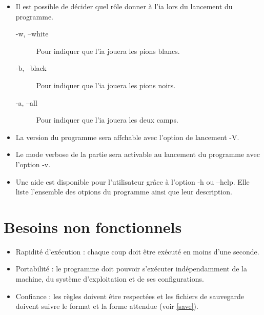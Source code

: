 \documentclass[10pt,a4paper]{article}
\begin{document}
\begin {itemize}
\begin{figure}[H]
\begin{BVerbatim}
    \end{BVerbatim}
    \caption {Exemple de grille générée avec l'option \textsc{-s2}.\label{fig:exemple_taille}}
  \end{figure}
\item  Il est possible de décider quel rôle donner à l'ia lors du lancement du programme.
  \begin{description}
  \item [-w, --white] Pour indiquer que l'ia jouera les pions blancs.
  \item [-b, --black] Pour indiquer que l'ia jouera les pions noirs.
  \item [-a, --all] Pour indiquer que l'ia jouera les deux camps.
  \end{description}
\item  La version du programme sera affchable avec l'option de lancement -V. 
\item  Le mode verbose de la partie sera activable au lancement du programme avec l'option -v. %
\item  Une aide est disponible pour l'utilisateur grâce à l'option -h ou --help. Elle liste l'ensemble des otpions du programme ainsi que leur description.
\end{itemize}

\newpage
\section{Besoins non fonctionnels}

\begin{itemize} 
\item Rapidité d'exécution : chaque coup doit être exécuté en moins d'une seconde.
\item Portabilité : le programme doit pouvoir s'exécuter indépendamment de la machine, du système d'exploitation et de ses configurations.
\item Confiance : les règles doivent être respectées et les fichiers de sauvegarde doivent suivre le format et la forme attendue (voir \ref{save}).
\end{itemize}
\end{document}
